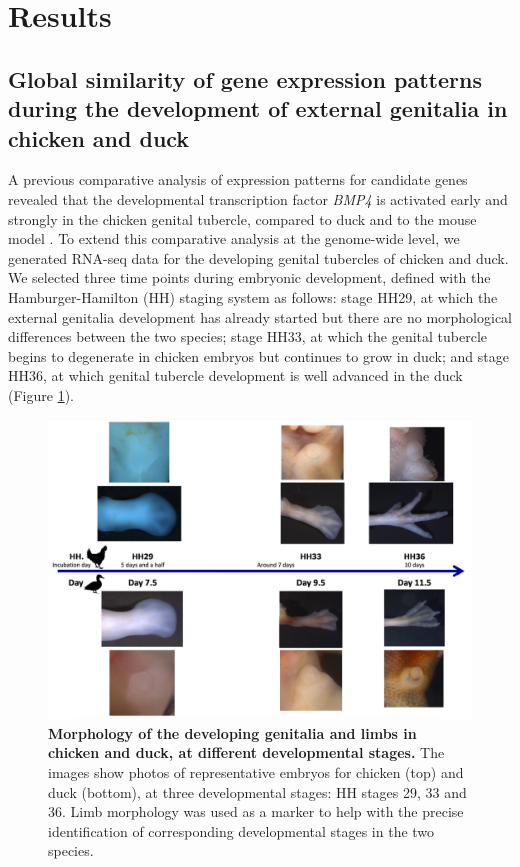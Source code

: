 \section{Results}

\subsection{Global similarity of gene expression patterns during the development of external genitalia in chicken and duck}

A previous comparative analysis of expression patterns for candidate genes revealed that the developmental transcription factor \textit{BMP4} is activated early and strongly in the chicken genital tubercle, compared to duck and to the mouse model \citep{herrera_developmental_2013}. To extend this comparative analysis at the genome-wide level, we generated RNA-seq data for the developing genital tubercles of chicken and duck. We selected three time points during embryonic development, defined with the Hamburger-Hamilton (HH) staging system \citep{hamburger_series_1951} as follows: stage HH29, at which the external genitalia development has already started but there are no morphological differences between the two species; stage HH33, at which the genital tubercle begins to degenerate in chicken embryos but continues to grow in duck; and stage HH36, at which genital tubercle development is well advanced in the duck (Figure \ref{fig:IPLOSS-fig-sampling-scheme}).\\ 

\begin{figure}[h]
 \centering
 \includegraphics[width=1\textwidth, page=1] {figures/IPLOSS/SamplingScheme.png}
 \caption[Morphology of the developing genitalia and limbs in chicken and duck.]{
 \textbf{Morphology of the developing genitalia and limbs in chicken and duck, at different developmental stages.} The images show photos of representative embryos for chicken (top) and duck (bottom), at three developmental stages: HH stages 29, 33 and 36. Limb morphology was used as a marker to help with the precise identification of corresponding developmental stages in the two species. \\
 }
 \label{fig:IPLOSS-fig-sampling-scheme}
\end{figure} 

